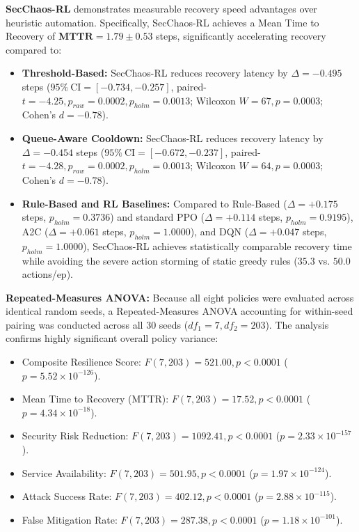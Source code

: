 \documentclass[ASNA,twocolumn]{USG}
\begin{document}
\textbf{SecChaos-RL} demonstrates measurable recovery speed advantages over heuristic automation. Specifically, SecChaos-RL achieves a Mean Time to Recovery of $\mathbf{\text{MTTR} = 1.79 \pm 0.53}$ steps, significantly accelerating recovery compared to:
\begin{itemize}
    \item \textbf{Threshold-Based:} SecChaos-RL reduces recovery latency by $\Delta = -0.495$ steps ($95\%\ \text{CI} = [-0.734, -0.257]$, paired-$t = -4.25, p_{raw} = 0.0002, p_{holm} = 0.0013$; Wilcoxon $W = 67, p = 0.0003$; Cohen's $d = -0.78$).
    \item \textbf{Queue-Aware Cooldown:} SecChaos-RL reduces recovery latency by $\Delta = -0.454$ steps ($95\%\ \text{CI} = [-0.672, -0.237]$, paired-$t = -4.28, p_{raw} = 0.0002, p_{holm} = 0.0013$; Wilcoxon $W = 64, p = 0.0003$; Cohen's $d = -0.78$).
    \item \textbf{Rule-Based and RL Baselines:} Compared to Rule-Based ($\Delta = +0.175$ steps, $p_{holm} = 0.3736$) and standard PPO ($\Delta = +0.114$ steps, $p_{holm} = 0.9195$), A2C ($\Delta = +0.061$ steps, $p_{holm} = 1.0000$), and DQN ($\Delta = +0.047$ steps, $p_{holm} = 1.0000$), SecChaos-RL achieves statistically comparable recovery time while avoiding the severe action storming of static greedy rules ($35.3$ vs. $50.0$ actions/ep).
\end{itemize}

\textbf{Repeated-Measures ANOVA:} Because all eight policies were evaluated across identical random seeds, a Repeated-Measures ANOVA accounting for within-seed pairing was conducted across all 30 seeds ($df_1 = 7, df_2 = 203$). The analysis confirms highly significant overall policy variance:
\begin{itemize}
    \item Composite Resilience Score: $F(7, 203) = 521.00, p < 0.0001$ ($p = 5.52 \times 10^{-126}$).
    \item Mean Time to Recovery (MTTR): $F(7, 203) = 17.52, p < 0.0001$ ($p = 4.34 \times 10^{-18}$).
    \item Security Risk Reduction: $F(7, 203) = 1092.41, p < 0.0001$ ($p = 2.33 \times 10^{-157}$).
    \item Service Availability: $F(7, 203) = 501.95, p < 0.0001$ ($p = 1.97 \times 10^{-124}$).
    \item Attack Success Rate: $F(7, 203) = 402.12, p < 0.0001$ ($p = 2.88 \times 10^{-115}$).
    \item False Mitigation Rate: $F(7, 203) = 287.38, p < 0.0001$ ($p = 1.18 \times 10^{-101}$).
\end{itemize}
\end{document}
